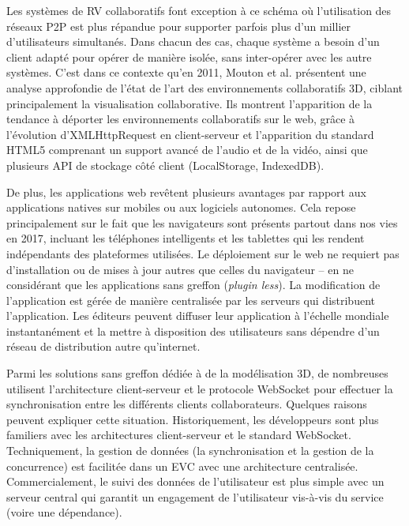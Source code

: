 Les systèmes de \gls{RV} collaboratifs font exception à ce schéma où l'utilisation 
des réseaux \gls{P2P} est plus répandue pour supporter parfois plus d'un millier 
d'utilisateurs simultanés. 
Dans chacun des cas, chaque système a besoin d'un client adapté pour opérer de 
manière isolée, sans inter-opérer avec les autre systèmes. 
C'est dans ce contexte qu'en 2011, Mouton et al. \cite{Mouton2011} présentent 
une analyse approfondie de l'état de l'art des environnements collaboratifs 
\gls{3D}, ciblant 
principalement la visualisation collaborative. 
Ils montrent l'apparition de la tendance à déporter les environnements collaboratifs 
sur le web, grâce à l'évolution d'XMLHttpRequest en client-serveur et l'apparition 
du standard HTML5 comprenant un support avancé de l'audio et de la vidéo, ainsi 
que plusieurs \gls{API} de stockage côté client (LocalStorage, IndexedDB). 

De plus, les applications web revêtent plusieurs avantages par rapport aux applications 
natives sur mobiles ou aux logiciels autonomes. 
Cela repose principalement sur le fait que les navigateurs sont présents partout 
dans nos vies en 2017, incluant les téléphones intelligents et les 
tablettes qui les rendent indépendants des plateformes utilisées. 
Le déploiement sur le web ne requiert pas d'installation ou de mises à jour autres 
que celles du navigateur -- en ne considérant que les applications sans greffon (\textit{plugin less}). 
La modification de l'application est gérée de manière centralisée par les serveurs 
qui distribuent l'application. 
Les éditeurs peuvent diffuser leur application à l'échelle mondiale instantanément  
et la mettre à disposition des utilisateurs sans dépendre d'un réseau de distribution 
autre qu'internet.


Parmi les solutions sans greffon dédiée à de la modélisation \gls{3D}, de 
nombreuses utilisent l'architecture client-serveur et le 
protocole \gls{WebSocket} pour effectuer la synchronisation entre les différents 
clients collaborateurs. Quelques raisons peuvent expliquer cette situation. 
Historiquement, les développeurs sont plus familiers avec les architectures 
client-serveur et le standard \gls{WebSocket}. Techniquement, la gestion de 
données (la synchronisation et la gestion de la concurrence) est facilitée 
dans un \gls{EVC} avec une architecture centralisée. 
Commercialement, le suivi des données de l'utilisateur est plus simple avec un 
serveur central qui garantit un engagement de l'utilisateur vis-à-vis du service 
(voire une dépendance).


